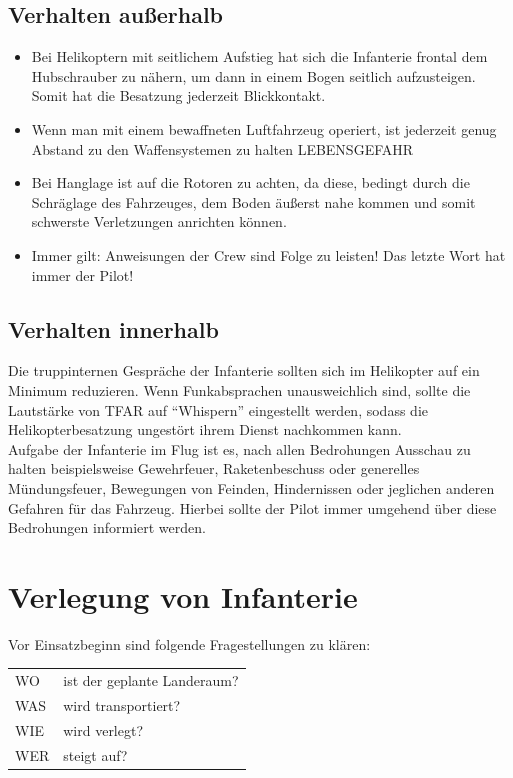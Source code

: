\subsection{Verhalten außerhalb}
\begin{itemize}
	\item Bei Helikoptern mit seitlichem Aufstieg hat sich die Infanterie frontal dem  
	Hubschrauber zu nähern, um dann in einem Bogen seitlich aufzusteigen. Somit hat 
	die Besatzung jederzeit Blickkontakt.  
	\item Wenn man mit einem bewaffneten Luftfahrzeug operiert, ist jederzeit genug Abstand 
	zu den Waffensystemen zu halten LEBENSGEFAHR
	\item Bei Hanglage ist auf die Rotoren zu achten, da diese, bedingt durch die Schräglage  
	des Fahrzeuges, dem Boden äußerst nahe kommen und somit schwerste 
	Verletzungen anrichten können. 
	\item Immer gilt: Anweisungen der Crew sind Folge zu leisten! Das letzte Wort hat immer  
	der Pilot! 
\end{itemize}
\subsection{Verhalten innerhalb}
Die truppinternen Gespräche der Infanterie sollten sich im Helikopter auf ein Minimum 
reduzieren. Wenn Funkabsprachen unausweichlich sind, sollte die Lautstärke von TFAR auf 
“Whispern” eingestellt werden, sodass die Helikopterbesatzung ungestört ihrem Dienst 
nachkommen kann.\\
Aufgabe der Infanterie im Flug ist es, nach allen Bedrohungen Ausschau zu halten 
beispielsweise Gewehrfeuer, Raketenbeschuss oder generelles Mündungsfeuer, 
Bewegungen von Feinden, Hindernissen oder jeglichen anderen Gefahren für das Fahrzeug. 
Hierbei sollte der Pilot immer umgehend über diese Bedrohungen informiert werden. 

\section{Verlegung von Infanterie}
Vor Einsatzbeginn sind folgende Fragestellungen zu klären:\\
\begin{tabular}{ll}
WO  & ist der geplante Landeraum?\\ 
WAS  & wird transportiert?\\ 
WIE  & wird verlegt?\\ 
WER  & steigt auf?\\ 
\end{tabular} \\


